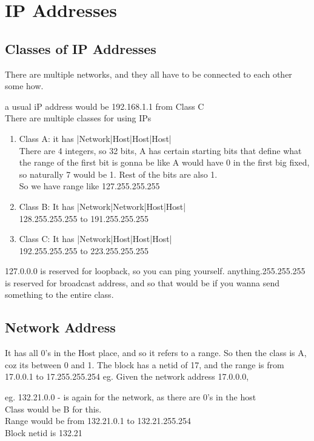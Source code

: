 \documentclass[11pt]{article}
\begin{document}
\section{IP Addresses}
\subsection{Classes of IP Addresses}
There are multiple networks, and they all have to be connected to each other some how. 

a usual iP address would be 192.168.1.1 from Class C\\
There are multiple classes for using IPs

\begin{enumerate}
	\item Class A: it has |Network|Host|Host|Host| \\
	There are 4 integers, so 32 bits, A has certain starting bits that define what the range of the first bit is gonna be
	like A would have 0 in the first big fixed, so naturally 7 would be 1. Rest of the bits are also 1. \\ So we have range like
	127.255.255.255
	\item Class B: It has |Network|Network|Host|Host|\\
	128.255.255.255 to 191.255.255.255
	\item Class C: It has |Network|Host|Host|Host|\\
	192.255.255.255 to 223.255.255.255
\end{enumerate}

127.0.0.0 is reserved for loopback, so you can ping yourself. 
anything.255.255.255 is reserved for broadcast address, and so that would be if you wanna send something to the entire class.
\subsection{Network Address}
It has all 0's in the Host place, and so it refers to a range. 
So then the class is A, coz its between 0 and 1. The block has a netid of 17, and the range is from 17.0.0.1 to 17.255.255.254
eg. Given the network address 17.0.0.0, 


eg. 132.21.0.0 - is again for the network, as there are 0's in the host\\
Class would be B for this. \\
Range would be from 132.21.0.1 to 132.21.255.254\\
Block netid is 132.21\\
\end{document}
